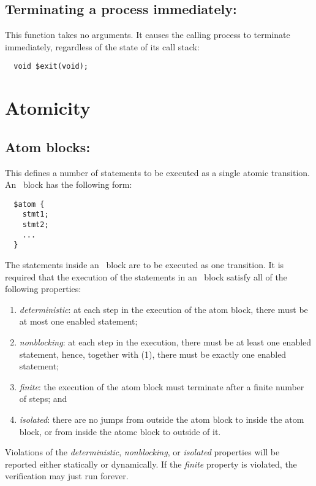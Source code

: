 \subsection{Terminating a process immediately: \cexit}

This function takes no arguments.  It causes the
calling process to terminate immediately, regardless of the state of
its call stack:
\begin{verbatim}
  void $exit(void);
\end{verbatim}

\section{Atomicity}

\subsection{Atom blocks: \catom} This defines a number of statements
to be executed as a single atomic transition.  An \catom~block has the
following form:
\begin{verbatim}
  $atom {
    stmt1;
    stmt2;
    ...
  }
\end{verbatim}

The statements inside an \catom\ block are to be executed as one
transition. It is required that the execution of the statements in an
\catom\ block satisfy all of the following properties:
\begin{enumerate}
\item \emph{deterministic}: at each step in the execution of the atom
  block, there must be at most one enabled statement;
\item \emph{nonblocking}: at each step in the execution, there must be
  at least one enabled statement, hence, together with (1), there must
  be exactly one enabled statement;
\item \emph{finite}: the execution of the atom block must terminate
  after a finite number of steps; and
\item \emph{isolated}: there are no jumps from outside the atom block
  to inside the atom block, or from inside the atomc block to outside
  of it.
\end{enumerate}

Violations of the \emph{deterministic}, \emph{nonblocking}, or
\emph{isolated} properties will be reported either statically or
dynamically.  If the \emph{finite} property is violated, the
verification may just run forever.

